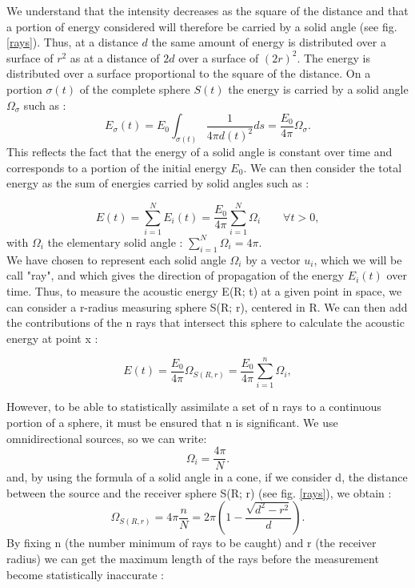 \documentclass[AMA,STIX1COL]{WileyNJD-v2}
\begin{document}
We understand that the intensity decreases as the square of the distance and that a portion of energy considered will therefore be carried by a solid angle (see fig. \ref{rays}). Thus, at a distance $d$ the same amount of energy is distributed over a surface of $r^2$ as at a distance of $2d$ over a surface of $(2r)^2$. The energy is distributed over a surface proportional to the square of the distance. On a portion $\sigma(t)$ of the complete sphere $S(t)$ the energy is carried by a solid angle $\Omega_{\sigma}$ such as :
%
\begin{equation} \label{eq_energie}
E_{\sigma}(t) = E_0 \int_{\sigma(t)}  \frac{1}{4\pi  d(t)^2} ds = \frac{E_0}{4\pi}  \Omega_{\sigma}.
\end{equation}
%
This reflects the fact that the energy of a solid angle is constant over time and corresponds to a portion of the initial energy $E_0$. We can then consider the total energy as the sum of energies carried by solid angles such as : 

\begin{equation}
E(t) = \sum_{i=1}^N E_i(t) = \frac{E_0}{4\pi}  \sum_{i=1}^N \Omega_i  \qquad \forall t > 0,
\end{equation}
with  $\Omega_i$ the elementary solid angle : $ \sum_{i=1}^N \Omega_i = 4\pi$. \\

We have chosen to represent each solid angle $ \Omega_i$ by a vector $u_i$, which we will be call "ray", and which gives the direction of propagation of the energy $E_i(t)$ over time. Thus, to measure the acoustic energy E(R; t) at a given point in space, we can consider a r-radius measuring sphere S(R; r), centered in R. We can then add the contributions of the n rays that intersect this sphere to calculate the acoustic energy at point x :

\begin{equation}
E(t) = \frac{E_0}{4\pi}\Omega_{S(R,r)} = \frac{E_0}{4\pi}  \sum_{i=1}^n \Omega_i,
\end{equation}

However, to be able to statistically assimilate a set of n rays to a continuous portion of a sphere, it must be ensured that n is significant. We use omnidirectional sources, so we can write:
\begin{equation}
	\Omega_i = \frac{4\pi}{N}.
\end{equation}
%
and, by using the formula of a solid angle in a cone, if we consider d, the distance between the source and the receiver sphere S(R; r) (see fig. \ref{rays}), we obtain :
\begin{equation}
	\Omega_{S(R,r)} = 4\pi \frac{n}{N} = 2\pi \left(1- \frac{\sqrt{d^2-r^2}}{d}\right).
\end{equation}
%
By fixing n (the number minimum of rays to be caught) and r (the receiver radius) we can get the maximum length of the rays before the measurement become statistically inaccurate  \cite{cfa} :
\end{document}
